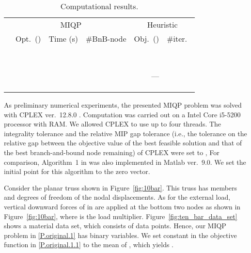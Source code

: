 \documentclass[a4paper,11pt]{scrartcl}
\theoremstyle{plain}
\theoremstyle{definition}
\theoremstyle{remark}
\newcommand{\reffig}[1]{Figure~\ref{#1}}
\begin{document}
\begin{table}[bp]
  \centering
  \caption{Computational results.}
  \label{tab:result}
  \begin{tabular}{rrrrrr}
    \toprule
    & \multicolumn{3}{c}{MIQP} & \multicolumn{2}{c}{Heuristic \cite{KO16}} \\
    \cmidrule(lr){2-4}  \cmidrule(l){5-6}
     & Opt.\ () & Time (s) & {\#}BnB-node 
    & Obj.\ () & {\#}iter.\ \\
    \midrule
      &   &  &  &  &  \\
      &  &  &   &  &  \\
      &  &  &  &  &  \\
      &  &  &  &  &  \\
      &  &  &  &  &  \\
      &  &  &  &  &  \\
      &  &  &  &  &  \\
      &  &  &  &  &  \\
      &  &  &  & --- &  \\
      &  &  &  &  &  \\
     &  &  &   &  &  \\
     &  &  &  &  &  \\
    \bottomrule
  \end{tabular}
\end{table}

As preliminary numerical experiments, the presented MIQP problem was 
solved with CPLEX ver.~12.8.0 \cite{cplex}. 
Computation was carried out on a  Intel Core i5-5200 
processor with  RAM. 
We allowed CPLEX to use up to four threads. 
The integrality tolerance and 
the relative MIP gap tolerance (i.e., the tolerance on the relative gap 
between the objective value of the best feasible solution and that of 
the best branch-and-bound node remaining) of CPLEX were set to , 
For comparison, Algorithm~1 in \cite{KO16} was also implemented 
in Matlab ver.\ 9.0. 
We set the initial point for this algorithm to the zero vector. 

Consider the planar truss shown in \reffig{fig:10bar}. 
This truss has  members and  degrees of freedom 
of the nodal displacements. 
As for the external load, 
vertical downward forces of  in  are applied at the bottom two nodes as shown in \reffig{fig:10bar}, 
where  is the load multiplier. 
\reffig{fig:ten_bar_data_set} shows a material data set, which 
consists of  data points. 
Hence, our MIQP problem in \eqref{P.original.1} has  binary variables. 
We set constant  in the objective function in \eqref{P.original.1.1} 
to the mean of 
, 
which yields . 
\end{document}
